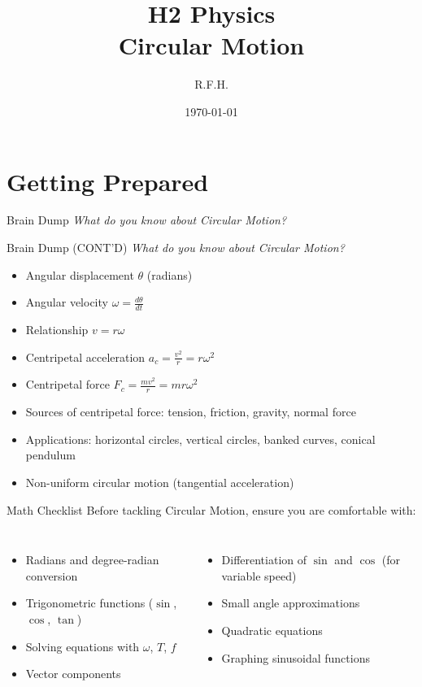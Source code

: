\documentclass[11pt]{beamer}
\title{H2 Physics \\ Circular Motion}
\author{R.F.H.}
\date{\today}
\begin{document}
\begin{frame}
\titlepage
\end{frame}

\section{Getting Prepared}

\begin{frame}[shrink=15]{Brain Dump}
\centering
\Large
\textit{What do you know about Circular Motion?}
\vfill
\end{frame}

\begin{frame}[shrink=15]{Brain Dump (CONT'D)}
\centering
\Large
\textit{What do you know about Circular Motion?}
\vfill
\begin{itemize}
    \item Angular displacement $\theta$ (radians)
    \item Angular velocity $\omega = \frac{d\theta}{dt}$
    \item Relationship $v = r\omega$
    \item Centripetal acceleration $a_c = \frac{v^2}{r} = r\omega^2$
    \item Centripetal force $F_c = \frac{mv^2}{r} = mr\omega^2$
    \item Sources of centripetal force: tension, friction, gravity, normal force
    \item Applications: horizontal circles, vertical circles, banked curves, conical pendulum
    \item Non-uniform circular motion (tangential acceleration)
\end{itemize}
\end{frame}

\begin{frame}{Math Checklist}
Before tackling Circular Motion, ensure you are comfortable with:
\begin{columns}[T]
\begin{itemize}
    \item Radians and degree-radian conversion
    \item Trigonometric functions ($\sin$, $\cos$, $\tan$)
    \item Solving equations with $\omega$, $T$, $f$
    \item Vector components
\end{itemize}
\begin{itemize}
    \item Differentiation of $\sin$ and $\cos$ (for variable speed)
    \item Small angle approximations
    \item Quadratic equations
    \item Graphing sinusoidal functions
\end{itemize}
\end{columns}
\end{frame}
\end{document}
